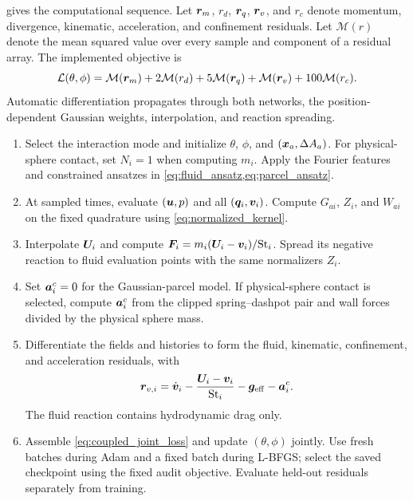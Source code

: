  gives the computational sequence. Let
$\bm{r}_m$, $r_d$, $\bm{r}_q$, $\bm{r}_v$, and $r_c$ denote
momentum, divergence, kinematic, acceleration, and confinement residuals.
Let $\mathcal{M}(r)$ denote the mean squared value over every sample and
component of a residual array. The implemented objective is
\begin{equation}
 \mathcal{L}(\theta,\phi)=
 \mathcal{M}(\bm{r}_m)
 +2\mathcal{M}(r_d)
 +5\mathcal{M}(\bm{r}_q)
 +\mathcal{M}(\bm{r}_v)
 +100\mathcal{M}(r_c).
 \label{eq:coupled_joint_loss}
\end{equation}
Automatic differentiation propagates through both networks, the
position-dependent Gaussian weights, interpolation, and reaction spreading.

\begin{algorithm}[!htbp]
\caption{Joint PINN training with an optional contact branch}
\label{alg:coupled_training}
\begingroup\small{}
\begin{enumerate}[leftmargin=1.8em,label=\arabic*.,itemsep=5pt]
\item Select the interaction mode and initialize $\theta$, $\phi$, and
$(\bm{x}_a,\Delta A_a)$. For physical-sphere contact, set $N_i=1$
when computing $m_i$. Apply the
Fourier features and constrained ansatzes in
\cref{eq:fluid_ansatz,eq:parcel_ansatz}.
\item At sampled times, evaluate $(\bm{u},p)$ and all
$(\bm{q}_i,\bm{v}_i)$. Compute $G_{ai}$, $Z_i$, and $W_{ai}$
on the fixed quadrature using \cref{eq:normalized_kernel}.
\item Interpolate $\bm{U}_i$ and compute
$\bm{F}_i=m_i(\bm{U}_i-\bm{v}_i)/\mathrm{St}_i$.
Spread its negative reaction to fluid evaluation points with the same
normalizers $Z_i$.
\item Set $\bm{a}_i^{c}=0$ for the Gaussian-parcel model.
If physical-sphere contact is selected, compute
$\bm{a}_i^{c}$ from the clipped spring--dashpot pair and wall forces
divided by the physical sphere mass.
\item Differentiate the fields and histories to form the fluid,
kinematic, confinement, and acceleration residuals, with
\[
 \bm{r}_{v,i}=\dot{\bm{v}}_i
 -\frac{\bm{U}_i-\bm{v}_i}{\mathrm{St}_i}
 -\bm{g}_{\mathrm{eff}}-\bm{a}_i^{c}.
\]
The fluid reaction contains hydrodynamic drag only.
\item Assemble \cref{eq:coupled_joint_loss} and update
$(\theta,\phi)$ jointly. Use fresh batches during Adam and a fixed
batch during L-BFGS; select the saved checkpoint using the fixed audit
objective. Evaluate held-out residuals separately from training.
\end{enumerate}
\endgroup
\end{algorithm}
\FloatBarrier

